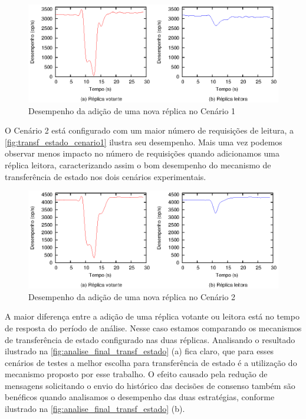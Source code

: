 \begin{figure}[ht]
  \centering
  \includegraphics[width=14cm]{conteudo/capitulos/figuras/final-transf-estado-pr50.eps}
  \caption{Desempenho da adição de uma nova réplica no Cenário 1}
  \label{fig:transf_estado_cenario1}
\end{figure}

O Cenário 2 está configurado com um maior número de requisições de leitura, a
\autoref{fig:transf_estado_cenario1} ilustra seu desempenho. Mais uma vez podemos observar
menos impacto no número de requisições quando adicionamos uma réplica leitora,
caracterizando assim o bom desempenho do mecanismo de transferência de estado nos dois
cenários experimentais.

\begin{figure}[ht]
  \centering
  \includegraphics[width=14cm]{conteudo/capitulos/figuras/final-transf-estado-pr80.eps}
  \caption{Desempenho da adição de uma nova réplica no Cenário 2}
  \label{fig:transf_estado_cenario2}
\end{figure}

A maior diferença entre a adição de uma réplica votante ou leitora está no tempo de
resposta do período de análise. Nesse caso estamos comparando os mecanismos de
transferência de estado configurado nas duas réplicas. Analisando o resultado ilustrado na
\autoref{fig:analise_final_transf_estado} (a) fica claro, que para esses cenários de
testes a melhor escolha para transferência de estado é a utilização do mecanismo proposto
por esse trabalho. O efeito causado pela redução de mensagens solicitando o envio do
histórico das decisões de consenso também são benéficos quando analisamos o desempenho das
duas estratégias, conforme ilustrado na \autoref{fig:analise_final_transf_estado} (b).

